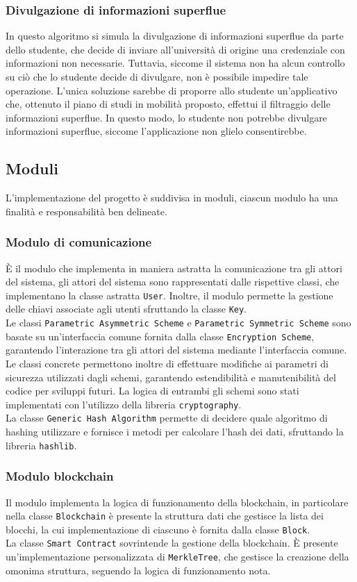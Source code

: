 \documentclass[a4paper,12pt]{article}
\begin{document}
\subsubsection{Divulgazione di informazioni superflue}
In questo algoritmo si simula la divulgazione di informazioni superflue da parte dello studente, che decide di inviare all'università di origine una credenziale con informazioni non necessarie. Tuttavia, siccome il sistema non ha alcun controllo su ciò che lo studente decide di divulgare, non è possibile impedire tale operazione. L'unica soluzione sarebbe di proporre allo studente un'applicativo che, ottenuto il piano di studi in mobilità proposto, effettui il filtraggio delle informazioni superflue. In questo modo, lo studente non potrebbe divulgare informazioni superflue, siccome l'applicazione non glielo consentirebbe.
\subsection{Moduli}
L'implementazione del progetto è suddivisa in moduli, ciascun modulo ha una finalità e responsabilità ben delineate. 
\subsubsection{Modulo di comunicazione}

È il modulo che implementa in maniera astratta la comunicazione tra gli attori del sistema, gli attori del sistema sono rappresentati dalle rispettive classi, che implementano la classe astratta \texttt{User}.
Inoltre, il modulo permette la gestione delle chiavi associate agli utenti sfruttando la classe \texttt{Key}.
\\[1em]
Le classi \texttt{Parametric Asymmetric Scheme} e \texttt{Parametric Symmetric Scheme} sono basate su un'interfaccia comune fornita dalla classe \texttt{Encryption Scheme}, garantendo l'interazione tra gli attori del sistema mediante l'interfaccia comune.
Le classi concrete permettono inoltre di effettuare modifiche ai parametri di sicurezza utilizzati dagli schemi, garantendo estendibilità e manutenibilità del codice per sviluppi futuri. La logica di entrambi gli schemi sono stati implementati con l'utilizzo della libreria \texttt{cryptography}.
\\[1em]
La classe \texttt{Generic Hash Algorithm} permette di decidere quale algoritmo di hashing utilizzare e fornisce i metodi per calcolare l'hash dei dati, sfruttando la libreria \texttt{hashlib}. 

\subsubsection{Modulo blockchain}
Il modulo implementa la logica di funzionamento della blockchain, in particolare nella classe \texttt{Blockchain} è presente la struttura dati che gestisce la lista dei blocchi, la cui implementazione di ciascuno è fornita dalla classe \texttt{Block}. 
\\[1em]
La classe \texttt{Smart Contract} sovrintende la gestione della blockchain. È presente un'implementazione personalizzata di \texttt{MerkleTree}, che gestisce la creazione della omonima struttura, seguendo la logica di funzionamento nota.
\end{document}
